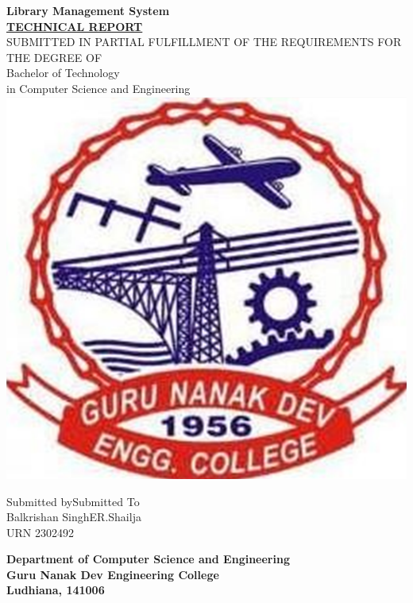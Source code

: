 \documentclass[12pt,a4paper]{report}
\begin{document}

\begin{titlepage}

    \begin{center}
        \huge{\textbf {Library Management System}}\\
        \vspace{10 mm}
        \Large{\textbf {\underline {TECHNICAL REPORT}}}\\
        \vspace{10mm}
        \large{SUBMITTED IN PARTIAL FULFILLMENT OF THE REQUIREMENTS FOR THE DEGREE OF}\\
        \normalsize{Bachelor of Technology}\\
        \normalsize{in Computer Science and Engineering}\\
        \vspace{26 mm}
        \includegraphics[height=6 cm]{"./src/GNDECLogo.png"}
    \end{center}

    \date{\today}
    \vspace{20 mm}

    \noindent
    Submitted by\hfill Submitted To\\
    Balkrishan Singh\hfill ER.Shailja\\
    URN 2302492\hfill\\
    \vspace{10mm}

    \begin{center}
        \textbf{Department of Computer Science and Engineering}\\
        \textbf{Guru Nanak Dev Engineering College}\\
        \textbf{Ludhiana, 141006}\\
    \end{center}
\end{titlepage}
\end{document}
